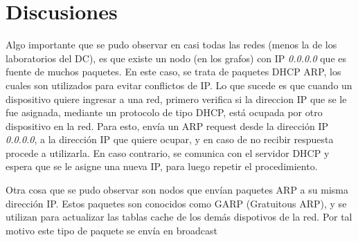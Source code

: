 \section{Discusiones}

Algo importante que se pudo observar en casi todas las redes (menos la de los laboratorios del DC), es que existe un nodo (en los grafos) con IP \textit{0.0.0.0} que es fuente de muchos paquetes. En este caso, se trata de paquetes DHCP ARP, los cuales son utilizados para evitar conflictos de IP. Lo que sucede es que cuando un dispositivo quiere ingresar a una red, primero verifica si la direccion IP que se le fue asignada, mediante un protocolo de tipo DHCP, está ocupada por otro dispositivo en la red. Para esto, envía un ARP request desde la dirección IP \textit{0.0.0.0}, a la dirección IP que quiere ocupar, y en caso de no recibir respuesta procede a utilizarla. En caso contrario, se comunica con el servidor DHCP y espera que se le asigne una nueva IP, para luego repetir el procedimiento.

Otra cosa que se pudo observar son nodos que envían paquetes ARP a su misma dirección IP. Estos paquetes son conocidos como GARP (Gratuitous ARP), y se utilizan para actualizar las tablas cache de los demás dispotivos de la red. Por tal motivo este tipo de paquete se envía en broadcast
